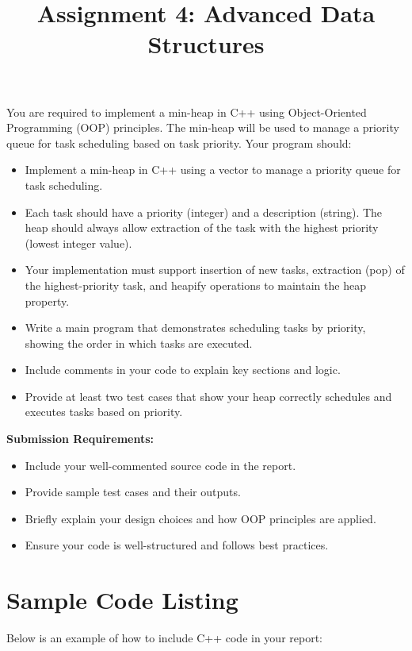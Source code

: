 \documentclass{../LatexStyle/style}
\title{\Large \bf Assignment 4: Advanced Data Structures}
\begin{document}
\maketitle

\begin{instructions}
You are required to implement a min-heap in C++ using Object-Oriented Programming (OOP) principles. The min-heap will be used to manage a priority queue for task scheduling based on task priority.
Your program should:
    \begin{itemize}
    \item Implement a min-heap in C++ using a vector to manage a priority queue for task scheduling.
    \item Each task should have a priority (integer) and a description (string). The heap should always allow extraction of the task with the highest priority (lowest integer value).
    \item Your implementation must support insertion of new tasks, extraction (pop) of the highest-priority task, and heapify operations to maintain the heap property.
    \item Write a main program that demonstrates scheduling tasks by priority, showing the order in which tasks are executed.
    \item Include comments in your code to explain key sections and logic.
    \item Provide at least two test cases that show your heap correctly schedules and executes tasks based on priority.
\end{itemize}
    \textbf{Submission Requirements:}
    \begin{itemize}
        \item Include your well-commented source code in the report.
        \item Provide sample test cases and their outputs.
        \item Briefly explain your design choices and how OOP principles are applied.
        \item Ensure your code is well-structured and follows best practices.
    \end{itemize}
\end{instructions}





\section{Sample Code Listing}
Below is an example of how to include C++ code in your report:
\end{document}
